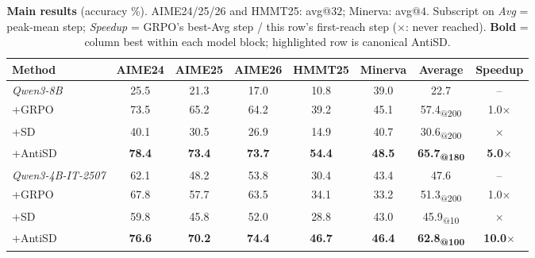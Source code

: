 \begin{table}[ht]
  \caption{\textbf{Main results} (accuracy \%). AIME24/25/26 and HMMT25: avg@$32$; Minerva: avg@$4$. Subscript on \emph{Avg} = peak-mean step; \emph{Speedup} = GRPO's best-Avg step / this row's first-reach step ($\times$: never reached). \textbf{Bold} = column best within each model block; highlighted row is canonical AntiSD.}
  \vspace{-0.5em}
  \label{tab:main}
  \centering
  \small
  \setlength{\tabcolsep}{5pt}
  \renewcommand{\arraystretch}{0.95}
  \begin{tabular}{l|c c c c c|c|c}
    \toprule
    Method                             & \textbf{AIME24} & \textbf{AIME25} & \textbf{AIME26} & \textbf{HMMT25} & \textbf{Minerva} & \textbf{Average}                  & \textbf{Speedup}      \\
    \midrule
    \textit{Qwen3-8B}                  & 25.5            & 21.3            & 17.0            & 10.8            & 39.0             & 22.7                              & --                    \\
    \quad +GRPO                        & 73.5            & 65.2            & 64.2            & 39.2            & 45.1             & 57.4\textsubscript{@200}          & 1.0$\times$           \\
    \quad +SD                          & 40.1            & 30.5            & 26.9            & 14.9            & 40.7             & 30.6\textsubscript{@200}          & $\times$              \\
    \rowcolor{antisdrow} \quad +AntiSD & \textbf{78.4}   & \textbf{73.4}   & \textbf{73.7}   & \textbf{54.4}   & \textbf{48.5}    & \textbf{65.7\textsubscript{@180}} & \textbf{5.0$\times$}  \\
    \midrule
    \textit{Qwen3-4B-IT-2507}          & 62.1            & 48.2            & 53.8            & 30.4            & 43.4             & 47.6                              & --                    \\
    \quad +GRPO                        & 67.8            & 57.7            & 63.5            & 34.1            & 33.2             & 51.3\textsubscript{@200}          & 1.0$\times$           \\
    \quad +SD                          & 59.8            & 45.8            & 52.0            & 28.8            & 43.0             & 45.9\textsubscript{@10}           & $\times$              \\
    \rowcolor{antisdrow} \quad +AntiSD & \textbf{76.6}   & \textbf{70.2}   & \textbf{74.4}   & \textbf{46.7}   & \textbf{46.4}    & \textbf{62.8\textsubscript{@100}} & \textbf{10.0$\times$} \\

\end{tabular}
\end{table}
